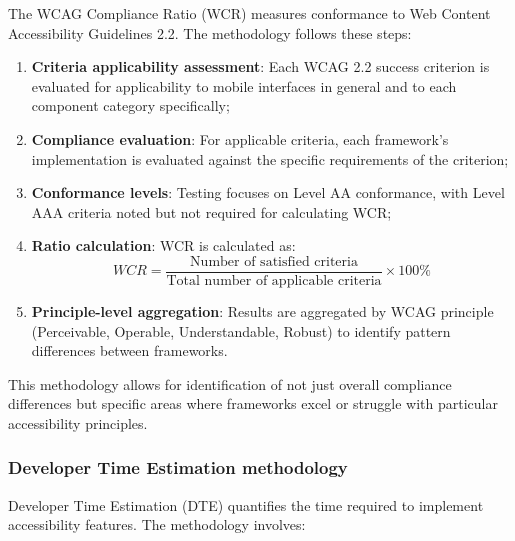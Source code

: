 The WCAG Compliance Ratio (WCR) measures conformance to Web Content Accessibility Guidelines 2.2. The methodology follows these steps:

\begin{enumerate}
    \item \textbf{Criteria applicability assessment}: Each WCAG 2.2 success criterion is evaluated for applicability to mobile interfaces in general and to each component category specifically;
    
    \item \textbf{Compliance evaluation}: For applicable criteria, each framework's implementation is evaluated against the specific requirements of the criterion;
    
    \item \textbf{Conformance levels}: Testing focuses on Level AA conformance, with Level AAA criteria noted but not required for calculating WCR;
    
    \item \textbf{Ratio calculation}: WCR is calculated as:
    \begin{equation}
    WCR = \frac{\text{Number of satisfied criteria}}{\text{Total number of applicable criteria}} \times 100\%
    \end{equation}
    
    \item \textbf{Principle-level aggregation}: Results are aggregated by WCAG principle (Perceivable, Operable, Understandable, Robust) to identify pattern differences between frameworks.
\end{enumerate}

This methodology allows for identification of not just overall compliance differences but specific areas where frameworks excel or struggle with particular accessibility principles.

\subsubsection{Developer Time Estimation methodology}
\label{subsubsec:dte-methodology}

Developer Time Estimation (DTE) quantifies the time required to implement accessibility features. The methodology involves:

